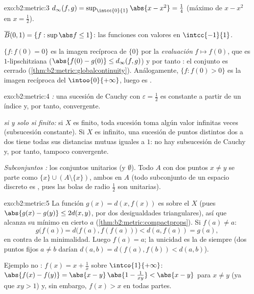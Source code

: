 \begin{solution}{exo:b2:metric:3}
$d_\infty(f, g) = \sup_{\intcc{0}{1}} \abs{x - x^2} = \frac14$
(máximo de $x - x^2$ en $x = \frac12$).

$\overline B(0, 1) = \{f : \sup\abs f \leq 1\}$: las funciones
 con valores en $\intcc{-1}{1}$.

$\{f : f(0) = 0\}$ es la imagen recíproca de $\{0\}$ por la
\emph{evaluación} $f \mapsto f(0)$, que es $1$-lipschitziana
($\abs{f(0) - g(0)} \leq d_\infty(f,g)$) y por tanto : el
conjunto es cerrado (\cref{thm:b2:metric:globalcontinuity}).
Análogamente, $\{f : f(0) > 0\}$ es la imagen recíproca del 
$\intoo{0}{+\infty}$, luego es .
\end{solution}

\begin{solution}{exo:b2:metric:4}
\emph{:} una sucesión de Cauchy con $\varepsilon = \frac12$
es constante a partir de un índice y, por tanto, convergente.

\emph{ si y solo si finito:} si $X$ es finito, toda sucesión
toma algún valor infinitas veces (subsucesión constante). Si $X$ es
infinito, una sucesión de puntos distintos dos a dos tiene todas sus
distancias mutuas iguales a $1$: no hay subsucesión de Cauchy y, por
tanto, tampoco convergente.

\emph{Subconjuntos :} los conjuntos unitarios (y
$\emptyset$). Todo $A$ con dos puntos $x \neq y$ se parte como $\{x\}
\cup (A \setminus\{x\})$, ambos  en $A$ (todo subconjunto de
un espacio discreto es , pues las bolas de radio $\frac12$ son
unitarias).
\end{solution}

\begin{solution}{exo:b2:metric:5}
La función $g(x) = d(x, f(x))$ es  sobre el  $X$
(pues $\abs{g(x) - g(y)} \leq 2d(x,y)$, por dos desigualdades
triangulares), así que alcanza su mínimo en cierto $a$
(\cref{thm:b2:metric:compactprops}). Si $f(a) \neq a$:
\[
g\bigl(f(a)\bigr) = d\bigl(f(a), f(f(a))\bigr) < d(a, f(a)) = g(a),
\]
en contra de la minimalidad. Luego $f(a) = a$; la unicidad es la de
siempre (dos puntos fijos $a \neq b$ darían $d(a,b) = d(f(a), f(b)) <
d(a,b)$).

Ejemplo no : $f(x) = x + \frac1x$ sobre
$\intco{1}{+\infty}$: $\abs{f(x) - f(y)} = \abs{x - y}\,\abs{1 -
\frac{1}{xy}} < \abs{x - y}$ para $x \neq y$ (ya que $xy > 1$) y, sin
embargo, $f(x) > x$ en todas partes.
\end{solution}

